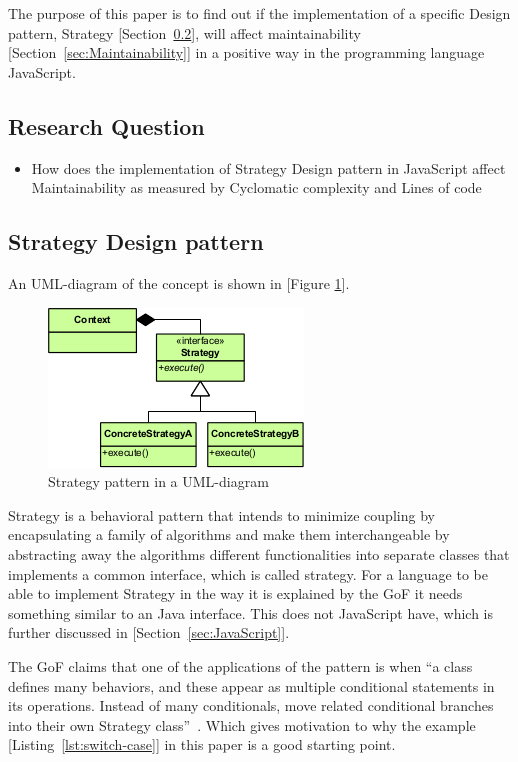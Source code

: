 \documentclass[conference, a4paper]{IEEEtran}
\begin{document}
The purpose of this paper is to find out if the implementation of a specific Design pattern, Strategy [Section~\ref{sec:Strategy}], will affect maintainability [Section~\ref{sec:Maintainability}] in a positive way in the programming language JavaScript.

\subsection{Research Question}
\begin{itemize}
	\item How does the implementation of Strategy Design pattern in JavaScript affect Maintainability as measured by Cyclomatic complexity and Lines of code
\end{itemize}

\subsection{Strategy Design pattern}
\label{sec:Strategy}

An UML-diagram of the concept is shown in [Figure \ref{fig:Strategy}].

\begin{figure}[ht!]
	\centering
	\includegraphics[scale=0.7]{Strategy_Pattern_in_UML.png}
	\caption{Strategy pattern in a UML-diagram}
	\label{fig:Strategy}
\end{figure}

Strategy is a behavioral pattern that intends to minimize coupling by encapsulating a family of algorithms and make them interchangeable by abstracting away the algorithms different functionalities into separate classes that implements a common interface, which is called strategy. For a language to be able to implement Strategy in the way it is explained by the GoF it needs something similar to an Java interface. This does not JavaScript have, which is further discussed in [Section~\ref{sec:JavaScript}].~\cite{bibitem:GoF}

The GoF claims that one of the applications of the pattern is when ``a class defines many behaviors, and these appear as multiple conditional statements in its operations. Instead of many conditionals, move related conditional branches into their own Strategy class''~\cite{bibitem:GoF}. Which gives motivation to why the example [Listing~\ref{lst:switch-case}] in this paper is a good starting point.
\end{document}
